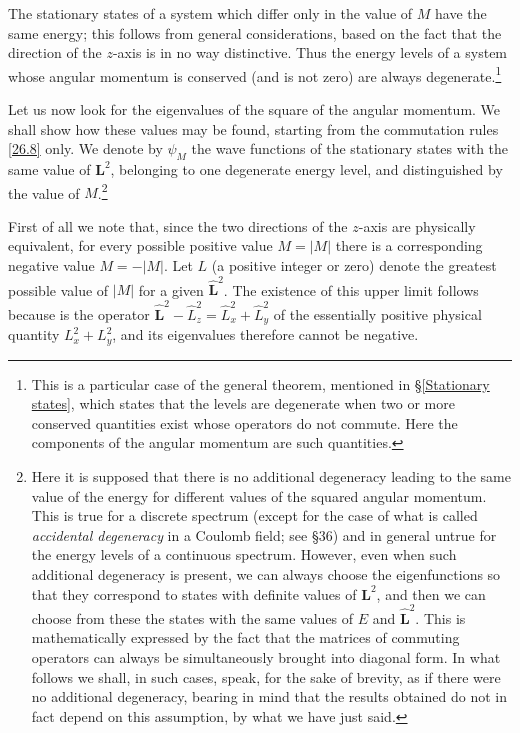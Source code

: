 The stationary states of a system which differ only in the value of $ M $ have the same energy; this follows from general considerations, based on the fact that the direction of the $ z $-axis is in no way distinctive. Thus the energy levels of a system whose angular momentum is conserved (and is not zero) are always degenerate.\footnote{This is a particular case of the general theorem, mentioned in \S\ref{Stationary states}, which states that the levels are degenerate when two or more conserved quantities exist whose operators do not commute. Here the components of the angular momentum are such quantities.
}

Let us now look for the eigenvalues of the square of the angular momentum. We shall show how these values may be found, starting from the commutation rules \eqref{26.8} only. We denote by $\psi_M$ the wave functions of the stationary states with the same value of $ \bm{L}^2 $, belonging to one degenerate energy level, and distinguished by the value of $ M $.\footnote{Here it is supposed that there is no additional degeneracy leading to the same value of the energy for different values of the squared angular momentum. This is true for a discrete spectrum (except for the case of what is called \textit{accidental degeneracy} in a Coulomb field; see §36) and in general untrue for the energy levels of a continuous spectrum. However, even when such additional degeneracy is present, we can always choose the eigenfunctions so that they correspond to states with definite values of $ \bm{L}^2 $, and then we can choose from these the states with the same values of $ E $ and $ \hat{\bm{L}}^2 $. This is mathematically expressed by the fact that the matrices of commuting operators can always be simultaneously brought into diagonal form. In what follows we shall, in such cases, speak, for the sake of brevity, as if there were no additional degeneracy, bearing in mind that the results obtained do not in fact depend on this assumption, by what we have just said.}

First of all we note that, since the two directions of the $ z $-axis are physically equivalent, for every possible positive value $ M = |M| $ there is a corresponding negative value $ M = −|M| $. Let $ L $ (a positive integer or zero) denote the greatest possible value of $ |M| $ for a given $ \hat{\bm{L}}^2 $. The existence of this upper limit follows because is the operator $ \hat{\bm{L}}^2-\hat{L}_z^2=\hat{L}_x^2+\hat{L}_y^2 $ of the essentially positive physical quantity $ L_x^2 + L_y^2 $, and its eigenvalues therefore cannot be negative.

